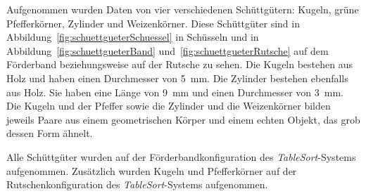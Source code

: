 


Aufgenommen wurden Daten von vier verschiedenen Schüttgütern: Kugeln, grüne Pfefferkörner, Zylinder und Weizenkörner.
Diese Schüttgüter sind in Abbildung~\ref{fig:schuettgueterSchuessel} in Schüsseln 
und in Abbildung~\ref{fig:schuettgueterBand} und~\ref{fig:schuettgueterRutsche} auf dem Förderband beziehungsweise auf der Rutsche zu sehen.
% 
Die Kugeln bestehen aus Holz und haben einen Durchmesser von \SI{5}{\milli\metre}.
Die Zylinder bestehen ebenfalls aus Holz. Sie haben eine Länge von \SI{9}{\milli\metre} und einen Durchmesser von \SI{3}{\milli\metre}.
Die Kugeln und der Pfeffer sowie die Zylinder und die Weizenkörner bilden jeweils 
Paare aus einem geometrischen Körper und einem echten Objekt, das grob dessen Form ähnelt.


Alle Schüttgüter wurden auf der Förderbandkonfiguration des \textit{TableSort}-Systems aufgenommen.
Zusätzlich wurden Kugeln und Pfefferkörner auf der Rutschenkonfiguration des \textit{TableSort}-Systems aufgenommen.

